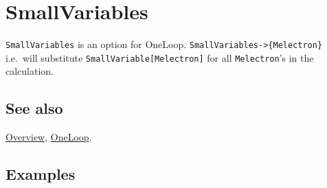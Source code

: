 \documentclass[../FeynCalcManual.tex]{subfiles}
\begin{document}
\hypertarget{smallvariables}{
\section{SmallVariables}\label{smallvariables}}

\texttt{SmallVariables} is an option for OneLoop.
\texttt{SmallVariables->\{\allowbreak{}Melectron\}} i.e.~will substitute
\texttt{SmallVariable[\allowbreak{}Melectron]} for all
\texttt{Melectron}'s in the calculation.

\subsection{See also}

\hyperlink{toc}{Overview}, \hyperlink{oneloop}{OneLoop}.

\subsection{Examples}
\end{document}
